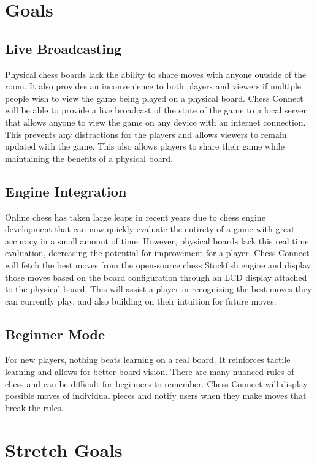 \documentclass{article}
\begin{document}
\section{Goals} 
\subsection{Live Broadcasting}
{Physical chess boards lack the ability to share moves with anyone outside of the room. It also provides an inconvenience to both players and viewers if multiple people wish to view the game being played on a physical board. 
Chess Connect will be able to provide a live broadcast of the state of the game to a local server that allows anyone to view the game on any device with an internet connection. 
This prevents any distractions for the players and allows viewers to remain updated with the game. This also allows players to share their game while maintaining the benefits of a physical board.} 

\subsection{Engine Integration}
{Online chess has taken large leaps in recent years due to chess engine development that can now quickly evaluate the entirety of a game with great accuracy in a small amount of time. 
However, physical boards lack this real time evaluation, decreasing the potential for improvement for a player. Chess Connect will fetch the best moves from the open-source chess Stockfish engine and display those moves based on the board configuration through an LCD display attached to the physical board. 
This will assist a player in recognizing the best moves they can currently play, and also building on their intuition for future moves.}

\subsection{Beginner Mode}
{For new players, nothing beats learning on a real board. It reinforces tactile learning and allows for better board vision. There are many nuanced rules of chess and can be difficult for beginners to remember. 
Chess Connect will display possible moves of individual pieces and notify users when they make moves that break the rules.}

\section{Stretch Goals}
\end{document}
